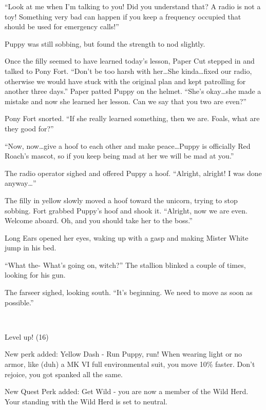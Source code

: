 ``Look at me when I'm talking to you! Did you understand that? A radio is not a toy! Something very bad can happen if you keep a frequency occupied that should be used for emergency calls!''

Puppy was still sobbing, but found the strength to nod slightly.

Once the filly seemed to have learned today's lesson, Paper Cut stepped in and talked to Pony Fort. ``Don't be too harsh with her\dots She kinda\dots fixed our radio, otherwise we would have stuck with the original plan and kept patrolling for another three days.'' Paper patted Puppy on the helmet. ``She's okay\dots she made a mistake and now she learned her lesson. Can we say that you two are even?''

Pony Fort snorted. ``If she really learned something, then we are. Foals, what are they good for?''

``Now, now\dots give a hoof to each other and make peace\dots Puppy is officially Red Roach's mascot, so if you keep being mad at her we will be mad at you.''

The radio operator sighed and offered Puppy a hoof. ``Alright, alright! I was done anyway\dots''

The filly in yellow slowly moved a hoof toward the unicorn, trying to stop sobbing. Fort grabbed Puppy's hoof and shook it. ``Alright, now we are even. Welcome aboard. Oh, and you should take her to the boss.''

\horizonline


Long Ears opened her eyes, waking up with a gasp and making Mister White jump in his bed.

``What the- What's going on, witch?'' The stallion blinked a couple of times, looking for his gun.

The farseer sighed, looking south. ``It's beginning. We need to move as soon as possible.''

~\vfill

\begin{engnote}
    Level up! (16)
    
    New perk added: Yellow Dash - Run Puppy, run! When wearing light or no armor, like (duh) a MK VI full environmental suit, you move 10\% faster. Don't rejoice, you got spanked all the same.
    
    New Quest Perk added: Get Wild - you are now a member of the Wild Herd. Your standing with the Wild Herd is set to neutral.
\end{engnote}


